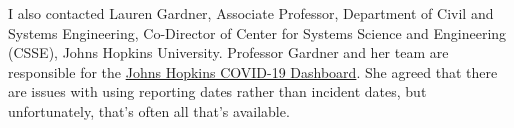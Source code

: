 \documentclass[10pt,reqno]{amsart}
\begin{document}








I also contacted Lauren Gardner, Associate Professor, Department of
Civil and Systems Engineering, Co-Director of Center for Systems
Science and Engineering (CSSE), Johns Hopkins University.  Professor
Gardner and her team are responsible for the
\href{https://coronavirus.jhu.edu/map.html}{Johns Hopkins COVID-19
  Dashboard}.  She agreed that there are issues with using reporting
dates rather than incident dates, but unfortunately, that's often all
that's available.\cite{Gardner2020Dates}
\end{document}
